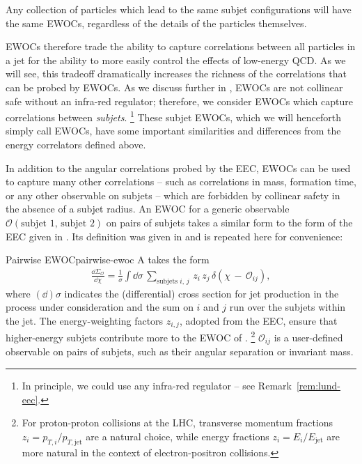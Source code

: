 Any collection of particles which lead to the same subjet configurations will have the same EWOCs, regardless of the details of the particles themselves.

EWOCs therefore trade the ability to capture correlations between all particles in a jet for the ability to more easily control the effects of low-energy QCD.
%
As we will see, this tradeoff dramatically increases the richness of the correlations that can be probed by EWOCs.
As we discuss further in , EWOCs are not collinear safe without an infra-red regulator;
%
therefore, we consider EWOCs which capture correlations between \textit{subjets}.%
\footnote{
    In principle, we could use any infra-red regulator -- see Remark~\ref{rem:lund-eec}.
}
%
These subjet EWOCs, which we will henceforth simply call EWOCs, have some important similarities and differences from the energy correlators defined above.



In addition to the angular correlations probed by the EEC, EWOCs can be used to capture many other correlations -- such as correlations in mass, formation time, or any other observable on subjets -- which are forbidden by collinear safety in the absence of a subjet radius.
%
An EWOC for a generic observable \(\mathcal{O}(\text{subjet 1, subjet 2})\) on pairs of subjets takes a similar form to the form of the EEC given in .
%
Its definition was given in  and is repeated here for convenience:
%
\begin{definitionbox}{Pairwise EWOC}{pairwise-ewoc}
    A  takes the form
    \begin{align}
        \label{eq:ewoc_def_2}
        \frac{\dd \Sigma_\mathcal{O}}{\dd \chi}
        =
        \frac{1}{\sigma}
        \int \dd\sigma \,
        \sum_{
            \text{subjets }
            i,\, j
        } \,
        z_i \, z_j \,
        \delta\left(\chi \, - \, \mathcal{O}_{ij}\right)
        ,
    \end{align}
    where \((\dd)\sigma\) indicates the (differential) cross section for jet production in the process under consideration and the sum on \(i\) and \(j\) run over the subjets within the jet.
    The energy-weighting factors \(z_{i,j}\), adopted from the EEC, ensure that higher-energy subjets contribute more to the EWOC of .%
    \footnote{
        For proton-proton collisions at the LHC, transverse momentum fractions \(z_i = p_{T,i}/p_{T,\text{jet}}\) are a natural choice, while energy fractions \(z_{i} = E_{i}/E_\text{jet}\) are more natural in the context of electron-positron collisions.
    }
    \(\mathcal{O}_{ij}\) is a user-defined  observable on pairs of subjets, such as their angular separation or invariant mass.
\end{definitionbox}



